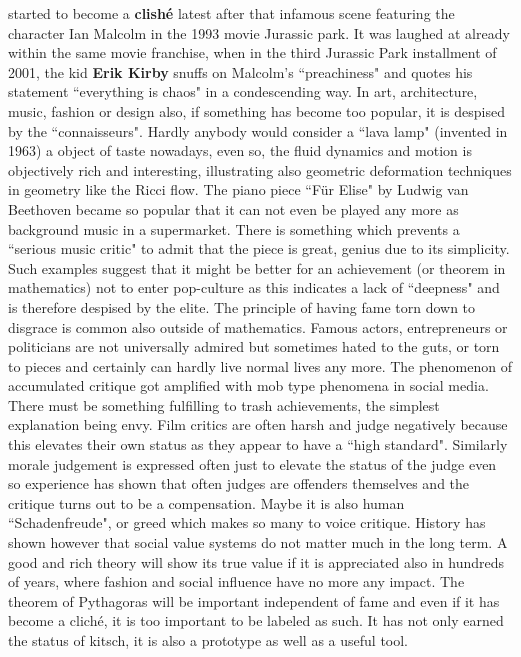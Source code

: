 \documentclass[12pt]{amsart}
\newcounter{example}    \def\example#1{ \item \fontsize{12}{15} \selectfont #1 \fontsize{12}{15} \selectfont }
\begin{document}
started to become a {\bf clish\'e} latest after that infamous scene featuring 
the character Ian Malcolm in the 1993 movie Jurassic park. 
It was laughed at already within the same movie franchise, when in
the third Jurassic Park installment of 2001, the kid {\bf Erik Kirby} snuffs on Malcolm's 
``preachiness" and quotes his statement ``everything is chaos" in a condescending way. 
In art, architecture, music, fashion or design also, if something has
become too popular, it is despised by the ``connaisseurs". Hardly anybody would consider a ``lava lamp"
(invented in 1963) a object of taste nowadays, even so, the fluid dynamics and motion is objectively 
rich and interesting, illustrating also geometric deformation techniques in geometry like the Ricci flow. 
The piano piece ``F\"ur Elise" by Ludwig van Beethoven became so popular that 
it can not even be played any more as background music in a supermarket. There is something which 
prevents a ``serious music critic" to admit that the piece is great, genius due to its simplicity.
Such examples suggest that it might be better for an achievement 
(or theorem in mathematics) not to enter pop-culture as this indicates a lack of ``deepness" and
is therefore despised by the elite. The principle of having fame torn down to disgrace is common also outside
of mathematics. Famous actors, entrepreneurs or politicians are not universally admired but sometimes
hated to the guts, or torn to pieces and certainly can hardly live normal lives any more. 
The phenomenon of accumulated critique got amplified with mob type phenomena in social media. 
There must be something fulfilling to trash achievements, the simplest explanation being envy.  
Film critics are often harsh and judge negatively because this elevates their own status as 
they appear to have a ``high standard". Similarly morale judgement is expressed often just to elevate 
the status of the judge even so experience has shown that often judges are offenders themselves and
the critique turns out to be a compensation.
Maybe it is also human ``Schadenfreude", or greed which makes so many to voice critique. 
History has shown however that social value systems do not matter much in the long term. 
A good and rich theory will show its true value if it is appreciated also in hundreds of years, 
where fashion and social influence have no more any impact. The theorem of Pythagoras will be important
independent of fame and even if it has become a clich\'e, it is too important to be labeled as such. It has
not only earned the status of kitsch, it is also a prototype as well as a useful tool. 
 
\end{document}
